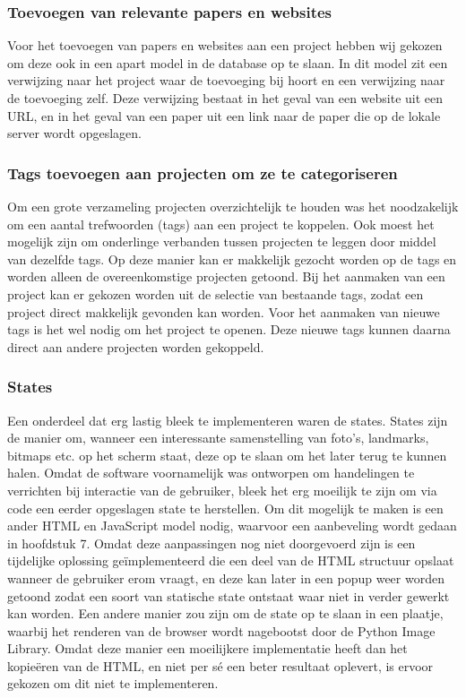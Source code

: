 \subsubsection{Toevoegen van relevante papers en websites}
Voor het toevoegen van papers en websites aan een project hebben wij gekozen om deze ook in een apart model in de database op te slaan.
In dit model zit een verwijzing naar het project waar de toevoeging bij hoort en een verwijzing naar de toevoeging zelf.
Deze verwijzing bestaat in het geval van een website uit een URL, en in het geval van een paper uit een link naar de paper die op de lokale server wordt opgeslagen.

\subsubsection{Tags toevoegen aan projecten om ze te categoriseren}
Om een grote verzameling projecten overzichtelijk te houden was het noodzakelijk om een aantal trefwoorden (tags) aan een project te koppelen.
Ook moest het mogelijk zijn om onderlinge verbanden tussen projecten te leggen door middel van dezelfde tags.
Op deze manier kan er makkelijk gezocht worden op de tags en worden alleen de overeenkomstige projecten getoond.
Bij het aanmaken van een project kan er gekozen worden uit de selectie van bestaande tags, zodat een project direct makkelijk gevonden kan worden.
Voor het aanmaken van nieuwe tags is het wel nodig om het project te openen.
Deze nieuwe tags kunnen daarna direct aan andere projecten worden gekoppeld.

\subsubsection{States}
Een onderdeel dat erg lastig bleek te implementeren waren de states.
States zijn de manier om, wanneer een interessante samenstelling van foto's, landmarks, bitmaps etc. op het scherm staat, deze op te slaan om het later terug te kunnen halen.
Omdat de software voornamelijk was ontworpen om handelingen te verrichten bij interactie van de gebruiker, bleek het erg moeilijk te zijn om via code een eerder opgeslagen state te herstellen.
Om dit mogelijk te maken is een ander HTML en JavaScript model nodig, waarvoor een aanbeveling wordt gedaan in hoofdstuk 7.
Omdat deze aanpassingen nog niet doorgevoerd zijn is een tijdelijke oplossing ge\"{i}mplementeerd die een deel van de HTML structuur opslaat wanneer de gebruiker erom vraagt, en deze kan later in een popup weer worden getoond zodat een soort van statische state ontstaat waar niet in verder gewerkt kan worden.
Een andere manier zou zijn om de state op te slaan in een plaatje, waarbij het renderen van de browser wordt nagebootst door de Python Image Library.
Omdat deze manier een moeilijkere implementatie heeft dan het kopie\"eren van de HTML, en niet per s\'e een beter resultaat oplevert, is ervoor gekozen om dit niet te implementeren.

